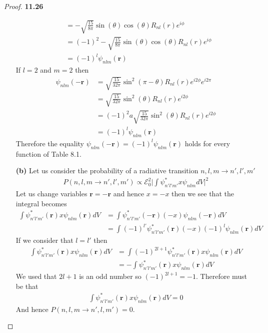\documentclass[11pt]{article}
\theoremstyle{definition}
\begin{document}
\begin{proof}{\textbf{11.26}}
\begin{itemize}
\begin{align*}
    &= -\sqrt{\frac{15}{8\pi}}\sin(\theta)\cos(\theta)R_{nl}(r)e^{i\phi}\\
    &= (-1)^2-\sqrt{\frac{15}{8\pi}}\sin(\theta)\cos(\theta)R_{nl}(r)e^{i\phi}\\
    &= (-1)^l\psi_{nlm}(\bm{r})
\end{align*}
If $l = 2$ and $m = 2$ then
\begin{align*}
    \psi_{nlm}(-\bm{r})
    &= \sqrt{\frac{15}{32\pi}}\sin^2(\pi -\theta)R_{nl}(r)e^{i2\phi}e^{i2\pi} \\
    &= \sqrt{\frac{15}{32\pi}}\sin^2(\theta)R_{nl}(r)e^{i2\phi}\\
    &= (-1)^2a\sqrt{\frac{15}{32\pi}}\sin^2(\theta)R_{nl}(r)e^{i2\phi}\\
    &= (-1)^l\psi_{nlm}(\bm{r})
\end{align*}
Therefore the equality $\psi_{nlm}(-\bm{r}) = (-1)^l\psi_{nlm}(\bm{r})$ holds
for every function of Table 8.1.

\item [\textbf{(b)}] Let us consider the probability of a radiative transition
$n,l,m \to n',l',m'$
\begin{align*}
    P(n,l,m \to n',l',m') \propto \mathcal{E}_0^2 \bigg|\int
    \psi_{n'l'm'}^*x\psi_{nlm}dV\bigg|^2
\end{align*}
Let us change variables $\bm{r} = - \bm{r}$ and hence $x = -x$ then we see that
the integral becomes
\begin{align*}
    \int \psi_{n'l'm'}^*(\bm{r})x\psi_{nlm}(\bm{r})dV
    &= \int \psi_{n'l'm'}^*(-\bm{r})(-x)\psi_{nlm}(-\bm{r})dV \\
    &= \int (-1)^{l'}\psi_{n'l'm'}^*(\bm{r})(-x)(-1)^l\psi_{nlm}(\bm{r})dV
\end{align*}
If we consider that $l = l'$ then
 \begin{align*}
    \int \psi_{n'l'm'}^*(\bm{r})x\psi_{nlm}(\bm{r})dV
    &= \int (-1)^{2l+1}\psi_{n'l'm'}^*(\bm{r})x\psi_{nlm}(\bm{r})dV \\
    &= -\int \psi_{n'l'm'}^*(\bm{r})x\psi_{nlm}(\bm{r})dV
\end{align*}
We used that $2l+1$ is an odd number so $(-1)^{2l+1} = -1$. Therefore must be 
that
\begin{align*}
    \int \psi_{n'l'm'}^*(\bm{r})x\psi_{nlm}(\bm{r})dV = 0
\end{align*}
And hence $P(n,l,m \to n',l,m') = 0$.
\end{itemize}
\end{proof}
\end{document}
